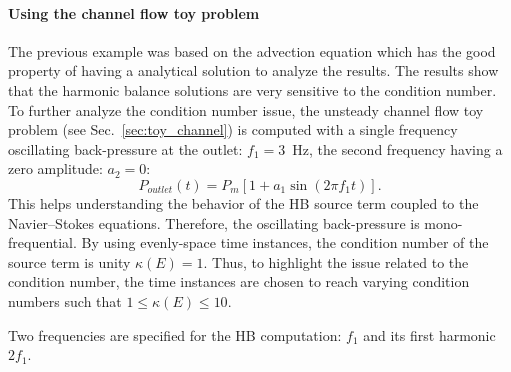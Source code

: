 \paragraph{Using the channel flow toy problem}
The previous example was based on the advection equation which
has the good property of having a analytical solution to 
analyze the results. The results show that the harmonic
balance solutions are very sensitive to the condition number.
To further analyze the condition number issue,
the unsteady channel flow toy problem
(see Sec.~\ref{sec:toy_channel}) is computed with a single
frequency oscillating back-pressure 
at the outlet: $f_1 = 3$~Hz, the second
frequency having a zero amplitude: $a_2= 0$:
\begin{equation}
   P_{outlet} (t) = P_m \left[ 1 + a_1 \sin \left(2 \pi f_1 t\right) \right].
\end{equation}
This helps understanding the behavior of the HB source term
coupled to the Navier--Stokes equations.
Therefore, the oscillating back-pressure is mono-frequential.
By using evenly-space time instances, the condition
number of the source term is unity $\kappa (E) = 1$. 
Thus, to highlight the issue related to the condition number,
the time instances are chosen to reach varying condition numbers
such that $1 \leq \kappa (E) \leq 10$.  

Two frequencies are
specified for the HB computation: $f_1$ and its first harmonic
$2f_1$.
